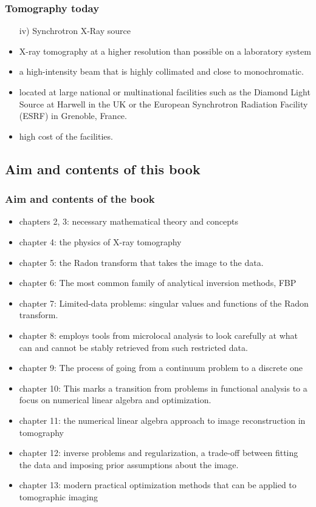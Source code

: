 \documentclass{beamer}
\begin{document}
\begin{frame}
	\frametitle{Tomography today}
	\begin{itemize}	
		\item [iv)] Synchrotron X-Ray source
		\item X-ray tomography at a higher resolution than possible on a laboratory system
		\item a high-intensity beam that is highly collimated and close to monochromatic. 
		 \pause
		\item located at large national or multinational facilities such as the Diamond Light Source at Harwell in the UK or the European Synchrotron Radiation Facility (ESRF) in Grenoble, France. 
		\item high cost of the facilities.
	\end{itemize}
\end{frame}


\subsection{Aim and contents of this book}
\begin{frame}
	\frametitle{Aim and contents of the book}
	\begin{itemize}
	 \item chapters 2, 3: necessary mathematical theory and concepts
		 \pause
	 \item chapter 4: the physics of X-ray tomography
		 \pause
	 \item chapter 5: the Radon transform that takes the image to the data.
		 \pause
	 \item chapter 6: The most common family of analytical inversion methods, FBP
		 \pause
	 \item chapter 7: Limited-data problems: singular values and functions of the Radon transform.
	\end{itemize}
\end{frame}
\begin{frame}
\begin{itemize}
\item chapter 8: employs tools from microlocal analysis to look carefully at what can and cannot be stably retrieved from such restricted data.
		 \pause
\item chapter 9: The process of going from a continuum problem to a discrete one
		 \pause
\item chapter 10: This marks a transition from problems in functional analysis to a focus on numerical linear algebra and optimization.
		 \pause
\item chapter 11: the numerical linear algebra approach to image reconstruction in tomography
		 \pause
\item chapter 12: inverse problems and regularization, a trade-off between fitting the data and imposing prior assumptions about the image.
		 \pause
\item chapter 13: modern practical optimization methods that can be applied to tomographic imaging
\end{itemize}
\end{frame}
\end{document}
